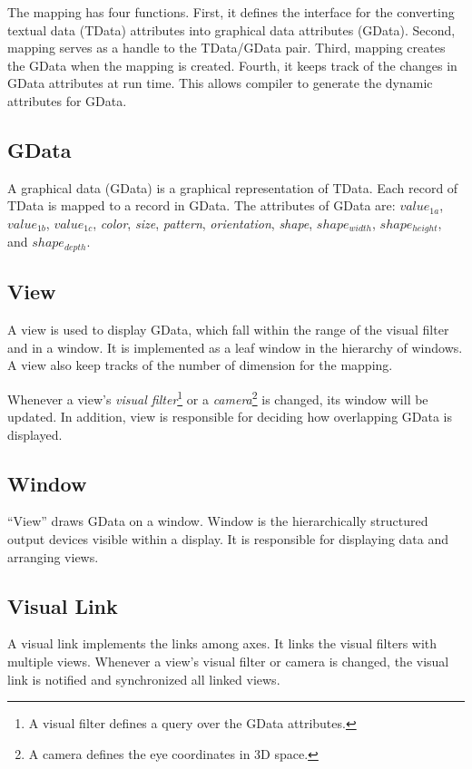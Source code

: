The mapping has four functions.  First, it defines the interface for
the converting textual data (TData) attributes into graphical data
attributes (GData).  Second, mapping serves as a handle to the
TData/GData pair.  Third, mapping creates the GData when the mapping
is created.  Fourth, it keeps track of the changes in GData
attributes at run time.  This allows compiler to generate the dynamic
attributes for GData.

\subsection{GData}

A graphical data (GData) is a graphical representation of TData.  
Each record of TData is mapped to a record in GData.  The attributes 
of GData are: $value_{1a}$, $value_{1b}$, $value_{1c}$, {\em color}, 
{\em size}, {\em pattern}, {\em orientation}, {\em shape}, 
$shape_{width}$, $shape_{height}$, and $shape_{depth}$.

\subsection{View}

A view is used to display GData, which fall within the range of the
visual filter and in a window.  It is implemented as a leaf window 
in the hierarchy of windows.  A view also keep tracks of the number
of dimension for the mapping.

Whenever a view's {\em visual filter}\footnote{A visual filter defines a
query over the GData attributes.} or a {\em camera}\footnote{A camera
defines the eye coordinates in 3D space.} is changed, its window will
be updated.  In addition, view is responsible for deciding how
overlapping GData is displayed.

\subsection{Window}

``View'' draws GData on a window.  Window is the hierarchically
structured output devices visible within a display.  It is
responsible for displaying data and arranging views.

\subsection{Visual Link}

A visual link implements the links among axes.  It links the visual
filters with multiple views.  Whenever a view's visual filter or
camera is changed, the visual link is notified and synchronized
all linked views.


